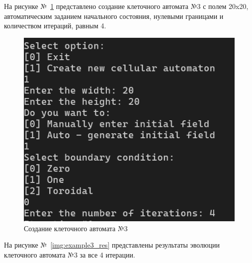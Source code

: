 \documentclass[a4paper, final]{article}
\begin{document}
На рисунке №~\ref{img:example3} представлено создание клеточного автомата №3 с полем 20x20, автоматическим заданием 
начального состояния, нулевыми границами и количеством итераций, равным 4.
\begin{figure}[H]
   \centering
   \includegraphics[scale=0.6]{example3.png}
   \caption{Создание клеточного автомата №3}
   \label{img:example3}
\end{figure}

На рисунке №~\ref{img:example3_res} представлены результаты эволюции клеточного автомата №3 за все 4 итерации.
\end{document}
